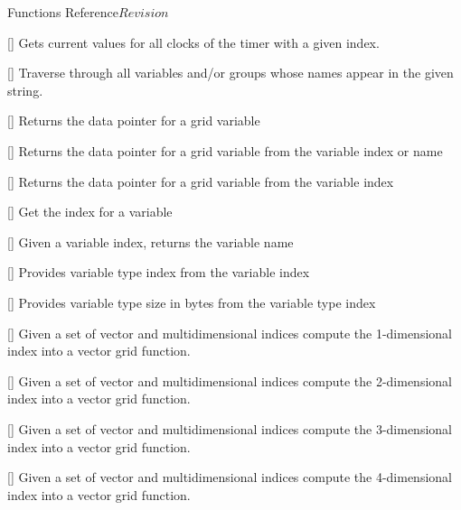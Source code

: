 \begin{cactuspart}{ Functions Reference}{}{$Revision$}
\begin{Lentry}
\item[\code{CCTK\_TimerStopI}] [\pageref{CCTK-TimerStopI}]
  Gets current values for all clocks of the timer with a given index.

\item[\code{CCTK\_TraverseString}] [\pageref{CCTK-TraverseString}]
  Traverse through all variables and/or groups whose names appear in the given string.

\item[\code{CCTK\_VarDataPtr}] [\pageref{CCTK-VarDataPtr}]
  Returns the data pointer for a grid variable

\item[\code{CCTK\_VarDataPtrB}] [\pageref{CCTK-VarDataPtrB}]
  Returns the data pointer for a grid variable from the variable index or name

\item[\code{CCTK\_VarDataPtrI}] [\pageref{CCTK-VarDataPtrI}]
  Returns the data pointer for a grid variable from the variable index

\item[\code{CCTK\_VarIndex}]
   [\pageref{CCTK-VarIndex}]
  Get the index for a variable

\item[\code{CCTK\_VarName}] [\pageref{CCTK-VarName}]
  Given a variable index, returns the variable name

\item[\code{CCTK\_VarTypeI}] [\pageref{CCTK-VarTypeI}]
  Provides variable type index from the variable index

\item[\code{CCTK\_VarTypeSize}] [\pageref{CCTK-VarTypeSize}]
  Provides variable type size in bytes from the variable type index

\item[\code{CCTK\_VECTGFINDEX1D}] [\pageref{CCTK-GFINDEX1D}]
  Given a set of vector and multidimensional indices compute the 1-dimensional
  index into a vector grid function.

\item[\code{CCTK\_VECTGFINDEX1D}] [\pageref{CCTK-GFINDEX2D}]
  Given a set of vector and multidimensional indices compute the 2-dimensional
  index into a vector grid function.

\item[\code{CCTK\_VECTGFINDEX3D}] [\pageref{CCTK-GFINDEX3D}]
  Given a set of vector and multidimensional indices compute the 3-dimensional
  index into a vector grid function.

\item[\code{CCTK\_VECTGFINDEX4D}] [\pageref{CCTK-GFINDEX4D}]
  Given a set of vector and multidimensional indices compute the 4-dimensional
  index into a vector grid function.


\end{Lentry}
\end{cactuspart}
